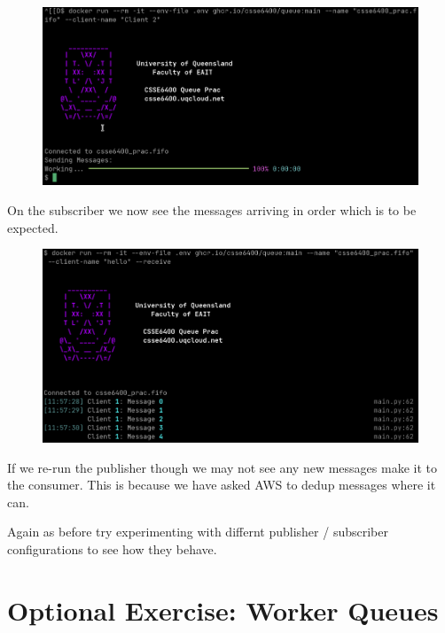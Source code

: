 \documentclass{csse4400}
\begin{document}
\begin{figure}[H]
  \includegraphics[width=\textwidth]{images/fifopub}
\end{figure}

On the subscriber we now see the messages arriving in order which is to be expected.

\begin{figure}[H]
  \includegraphics[width=\textwidth]{images/fifosub}
\end{figure}

If we re-run the publisher though we may not see any new messages make it to the consumer. This is because we have asked AWS to dedup messages where it can.


Again as before try experimenting with differnt publisher / subscriber configurations to see how they behave.



\section{Optional Exercise: Worker Queues}
\end{document}
